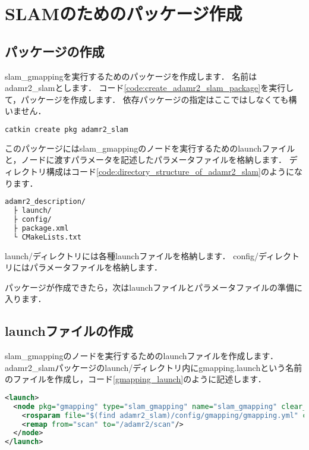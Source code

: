 \documentclass[{../../master}]{subfiles}
\begin{document}
\section{SLAMのためのパッケージ作成}

\subsection{パッケージの作成}

\textsf{slam\_gmapping}を実行するためのパッケージを作成します．
名前は\textsf{adamr2\_slam}とします．
コード\ref{code:create_adamr2_slam_package}を実行して，パッケージを作成します．
依存パッケージの指定はここではしなくても構いません．

\begin{lstlisting}[language=sh, label=code:create_adamr2_slam_package, caption=Create \textsf{adamr2\_slam} Package]
catkin create pkg adamr2_slam
\end{lstlisting}

このパッケージには\textsf{slam\_gmapping}のノードを実行するためのlaunchファイルと，ノードに渡すパラメータを記述したパラメータファイルを格納します．
ディレクトリ構成はコード\ref{code:directory_structure_of_adamr2_slam}のようになります．

\begin{lstlisting}[language=sh, caption=Directory Structure of adamr2\_slam, label=code;directory_structure_of_adamr2_slam]
adamr2_description/
  ├ launch/
  ├ config/
  ├ package.xml
  └ CMakeLists.txt
\end{lstlisting}

\textsf{launch/}ディレクトリには各種launchファイルを格納します．
\textsf{config/}ディレクトリにはパラメータファイルを格納します．

パッケージが作成できたら，次はlaunchファイルとパラメータファイルの準備に入ります．

\subsection{launchファイルの作成}

\textsf{slam\_gmapping}のノードを実行するためのlaunchファイルを作成します．
\textsf{adamr2\_slam}パッケージの\textsf{launch/}ディレクトリ内に\textsf{gmapping.launch}という名前のファイルを作成し，コード\ref{gmapping_launch}のように記述します．

\begin{lstlisting}[language=XML, label=code:gmapping_launch, caption=\textsf{gmapping.launch}]
<launch>
  <node pkg="gmapping" type="slam_gmapping" name="slam_gmapping" clear_params="true">
    <rosparam file="$(find adamr2_slam)/config/gmapping/gmapping.yml" command="load"/>
    <remap from="scan" to="/adamr2/scan"/>
  </node>
</launch>
\end{lstlisting}
\end{document}
